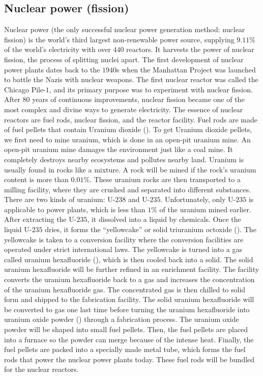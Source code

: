 \documentclass{article}
\begin{document}
\subsection{Nuclear power (fission)}
Nuclear power (the only successful nuclear power generation method: nuclear fission) is the world’s third largest non-renewable power source, supplying $9.11\%$ of the world’s electricity with over $440$ reactors. It harvests the power of nuclear fission, the process of splitting nuclei apart. 
The first development of nuclear power plants dates back to the $1940$s when the Manhattan Project was launched to battle the Nazis with nuclear weapons. The first nuclear reactor was called the Chicago Pile-$1$, and its primary purpose was to experiment with nuclear fission. After $80$ years of continuous improvements, nuclear fission became one of the most complex and divine ways to generate electricity. 
The essence of nuclear reactors are fuel rods, nuclear fission, and the reactor facility.
Fuel rods are made of fuel pellets that contain Uranium dioxide (). To get Uranium dioxide pellets, we first need to mine uranium, which is done in an open-pit uranium mine. An open-pit uranium mine damages the environment just like a coal mine. It completely destroys nearby ecosystems and pollutes nearby land. Uranium is usually found in rocks like a mixture. A rock will be mined if the rock’s uranium content is more than $0.01\%$. These uranium rocks are then transported to a milling facility, where they are crushed and separated into different substances. There are two kinds of uranium: U-$238$ and U-$235$. Unfortunately, only U-$235$ is applicable to power plants, which is less than $1\%$ of the uranium mined earlier. After extracting the U-$235$, it dissolved into a liquid by chemicals. Once the liquid U-$235$ dries, it forms the “yellowcake” or solid triuranium octoxide (). The yellowcake is taken to a conversion facility where the conversion facilities are operated under strict international laws. The yellowcake is turned into a gas called uranium hexafluoride (), which is then cooled back into a solid. The solid uranium hexafluoride will be further refined in an enrichment facility. The facility converts the uranium hexafluoride back to a gas and increases the concentration of the uranium hexafluoride gas. The concentrated gas is then chilled to solid form and shipped to the fabrication facility. The solid uranium hexafluoride will be converted to gas one last time before turning the uranium hexafluoride into uranium oxide powder () through a fabrication process. The uranium oxide powder will be shaped into small fuel pellets. Then, the fuel pellets are placed into a furnace so the powder can merge because of the intense heat. Finally, the fuel pellets are packed into a specially made metal tube, which forms the fuel rods that power the nuclear power plants today. These fuel rods will be bundled for the nuclear reactors. 
\end{document}
